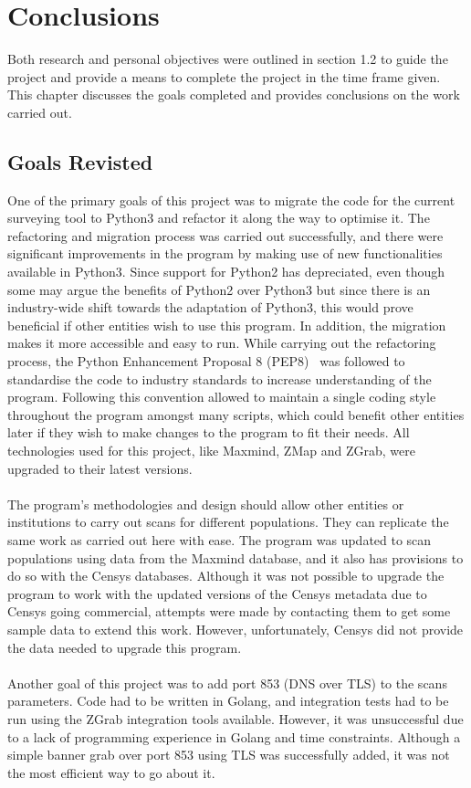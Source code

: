\section{Conclusions}
Both research and personal objectives were outlined in section 1.2 to guide the project and provide a means 
to complete the project in the time frame given. This chapter discusses the goals completed and provides conclusions on the work carried out.

\subsection{Goals Revisted}
One of the primary goals of this project was to migrate the code for the current surveying tool to Python3 and refactor it along the way 
to optimise it. The refactoring and migration process was carried out successfully, and there were significant improvements in the program 
by making use of new functionalities available in Python3. Since support for Python2 has depreciated, even though some may argue the benefits 
of Python2 over Python3 but since there is an industry-wide shift towards the adaptation of Python3, this would prove beneficial if other 
entities wish to use this program. In addition, the migration makes it more accessible and easy to run. While carrying out the refactoring process, 
the Python Enhancement Proposal 8 (PEP8)~\cite{pep8} was followed to standardise the code to industry standards to increase understanding of the program. 
Following this convention allowed to maintain a single coding style throughout the program amongst many scripts, which could benefit other entities later if 
they wish to make changes to the program to fit their needs. All technologies used for this project, like Maxmind, ZMap and ZGrab, were upgraded to their latest versions.\\\\
The program's methodologies and design should allow other entities or institutions to carry out scans for different populations. They can replicate the same work as carried out here with ease. 
The program was updated to scan populations using data from the Maxmind database, and it also has provisions to do so with the Censys databases. 
Although it was not possible to upgrade the program to work with the updated versions of the Censys metadata due to Censys going commercial, 
attempts were made by contacting them to get some sample data to extend this work. However, unfortunately, Censys did not provide the data needed to upgrade this program.\\\\
Another goal of this project was to add port 853 (DNS over TLS) to the scans parameters. Code had to be written in Golang, and 
integration tests had to be run using the ZGrab integration tools available. However, it was unsuccessful due to a lack of programming experience 
in Golang and time constraints. Although a simple banner grab over port 853 using TLS was successfully added, it was not the most efficient 
way to go about it. 

